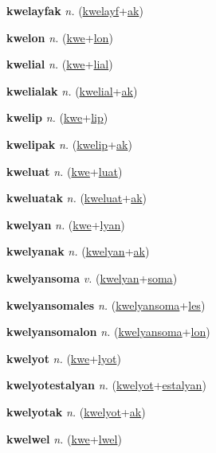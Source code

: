 \textbf{\hypertarget{kwelayfak}{kwelayfak}} \textit{n.} (\hyperlink{kwelayf}{kwelayf}+\allowbreak \hyperlink{ak}{ak})


\textbf{\hypertarget{kwelon}{kwelon}} \textit{n.} (\hyperlink{kwe}{kwe}+\allowbreak \hyperlink{lon}{lon})


\textbf{\hypertarget{kwelial}{kwelial}} \textit{n.} (\hyperlink{kwe}{kwe}+\allowbreak \hyperlink{lial}{lial})


\textbf{\hypertarget{kwelialak}{kwelialak}} \textit{n.} (\hyperlink{kwelial}{kwelial}+\allowbreak \hyperlink{ak}{ak})


\textbf{\hypertarget{kwelip}{kwelip}} \textit{n.} (\hyperlink{kwe}{kwe}+\allowbreak \hyperlink{lip}{lip})


\textbf{\hypertarget{kwelipak}{kwelipak}} \textit{n.} (\hyperlink{kwelip}{kwelip}+\allowbreak \hyperlink{ak}{ak})


\textbf{\hypertarget{kweluat}{kweluat}} \textit{n.} (\hyperlink{kwe}{kwe}+\allowbreak \hyperlink{luat}{luat})


\textbf{\hypertarget{kweluatak}{kweluatak}} \textit{n.} (\hyperlink{kweluat}{kweluat}+\allowbreak \hyperlink{ak}{ak})


\textbf{\hypertarget{kwelyan}{kwelyan}} \textit{n.} (\hyperlink{kwe}{kwe}+\allowbreak \hyperlink{lyan}{lyan})


\textbf{\hypertarget{kwelyanak}{kwelyanak}} \textit{n.} (\hyperlink{kwelyan}{kwelyan}+\allowbreak \hyperlink{ak}{ak})


\textbf{\hypertarget{kwelyansoma}{kwelyansoma}} \textit{v.} (\hyperlink{kwelyan}{kwelyan}+\allowbreak \hyperlink{soma}{soma})


\textbf{\hypertarget{kwelyansomales}{kwelyansomales}} \textit{n.} (\hyperlink{kwelyansoma}{kwelyansoma}+\allowbreak \hyperlink{les}{les})


\textbf{\hypertarget{kwelyansomalon}{kwelyansomalon}} \textit{n.} (\hyperlink{kwelyansoma}{kwelyansoma}+\allowbreak \hyperlink{lon}{lon})


\textbf{\hypertarget{kwelyot}{kwelyot}} \textit{n.} (\hyperlink{kwe}{kwe}+\allowbreak \hyperlink{lyot}{lyot})


\textbf{\hypertarget{kwelyotestalyan}{kwelyotestalyan}} \textit{n.} (\hyperlink{kwelyot}{kwelyot}+\allowbreak \hyperlink{estalyan}{estalyan})


\textbf{\hypertarget{kwelyotak}{kwelyotak}} \textit{n.} (\hyperlink{kwelyot}{kwelyot}+\allowbreak \hyperlink{ak}{ak})


\textbf{\hypertarget{kwelwel}{kwelwel}} \textit{n.} (\hyperlink{kwe}{kwe}+\allowbreak \hyperlink{lwel}{lwel})


